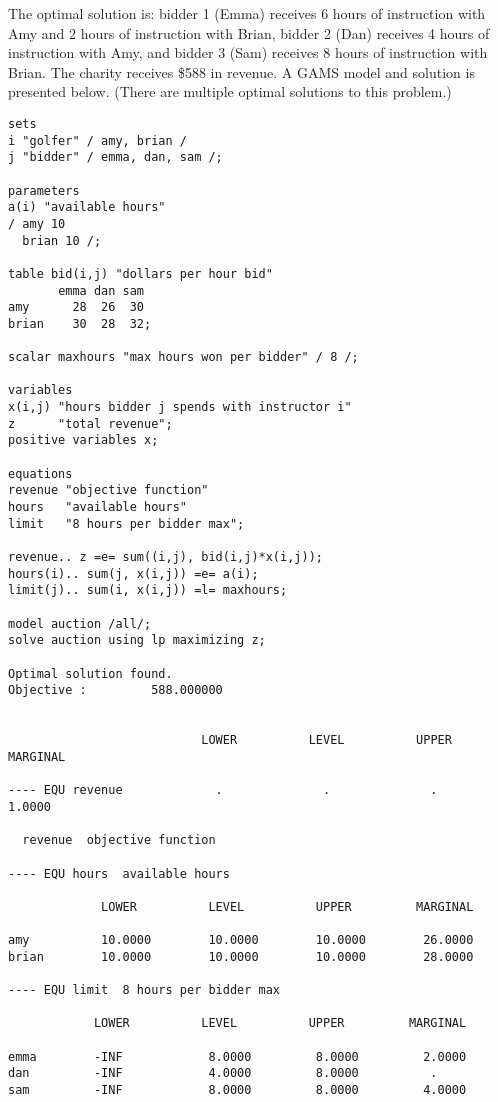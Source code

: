 \begin{enumerate}
\begin{solution}
The optimal solution is: bidder 1 (Emma) receives 6 hours of instruction with Amy and
2 hours of instruction with Brian, 
bidder 2 (Dan) receives 4 hours of instruction with Amy, 
and bidder 3 (Sam) receives 8 hours of instruction with Brian. The charity
receives \$588 in revenue. A GAMS model and solution is presented below. 
(There are multiple optimal solutions to this problem.)
\begin{Verbatim}
sets
i "golfer" / amy, brian /
j "bidder" / emma, dan, sam /;

parameters
a(i) "available hours"
/ amy 10
  brian 10 /;
  
table bid(i,j) "dollars per hour bid"
       emma dan sam
amy      28  26  30
brian    30  28  32;

scalar maxhours "max hours won per bidder" / 8 /;

variables
x(i,j) "hours bidder j spends with instructor i"
z      "total revenue";
positive variables x;

equations
revenue "objective function"
hours   "available hours"
limit   "8 hours per bidder max";

revenue.. z =e= sum((i,j), bid(i,j)*x(i,j));
hours(i).. sum(j, x(i,j)) =e= a(i);
limit(j).. sum(i, x(i,j)) =l= maxhours;

model auction /all/;
solve auction using lp maximizing z;

Optimal solution found.
Objective :         588.000000


                           LOWER          LEVEL          UPPER         MARGINAL

---- EQU revenue             .              .              .             1.0000      

  revenue  objective function

---- EQU hours  available hours

             LOWER          LEVEL          UPPER         MARGINAL

amy          10.0000        10.0000        10.0000        26.0000      
brian        10.0000        10.0000        10.0000        28.0000      

---- EQU limit  8 hours per bidder max

            LOWER          LEVEL          UPPER         MARGINAL

emma        -INF            8.0000         8.0000         2.0000      
dan         -INF            4.0000         8.0000          .          
sam         -INF            8.0000         8.0000         4.0000      


\end{Verbatim}
\end{solution}
\end{enumerate}
